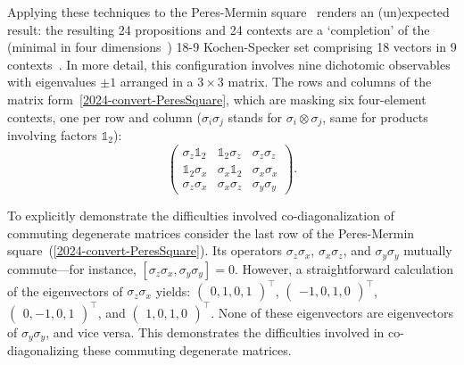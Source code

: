 \documentclass[
  twocolumn,
 showpacs,
 showkeys,
 preprintnumbers,
 amsmath,amssymb,
 aps,
 prl,
  longbibliography,
 floatfix,
 ]{revtex4-2}
\newcommand\myotimes{ }
\begin{document}
Applying these techniques to the Peres-Mermin square~\cite{peres111,mermin90b,peres-91,cabello2021contextuality} renders an (un)expected result:
the resulting 24 propositions and 24 contexts are a `completion' of the (minimal in four dimensions~\cite{Pavicic-2005}) 18-9 Kochen-Specker set comprising 18 vectors in 9 contexts~\cite{cabello-96}.
In more detail, this configuration involves nine dichotomic observables with eigenvalues $\pm 1$ arranged in a $3 \times 3$ matrix.
 The rows and columns of the matrix form~\eqref{2024-convert-PeresSquare}, which are masking six four-element contexts,
one per row and column ($\sigma_i \myotimes \sigma_j$ stands for $\sigma_i \otimes \sigma_j$, same for products involving factors $\mathbb{1}_2$):
\begin{equation}
\begin{pmatrix}
\sigma_z \myotimes  \mathbb{1}_2 & \mathbb{1}_2 \myotimes  \sigma_z & \sigma_z \myotimes  \sigma_z \\
\mathbb{1}_2 \myotimes  \sigma_x & \sigma_x \myotimes  \mathbb{1}_2 & \sigma_x \myotimes  \sigma_x \\
\sigma_z \myotimes  \sigma_x & \sigma_x \myotimes  \sigma_z & \sigma_y \myotimes  \sigma_y
\end{pmatrix}
.
\label{2024-convert-PeresSquare}
\end{equation}


To explicitly demonstrate the difficulties involved co-diagonalization of commuting degenerate matrices
consider the last row of  the Peres-Mermin square~(\ref{2024-convert-PeresSquare}).
Its operators
$\sigma_z  \myotimes   \sigma_x$, $\sigma_x  \myotimes   \sigma_z$, and $\sigma_y  \myotimes   \sigma_y $ mutually
commute---for instance, $[\sigma_z  \myotimes   \sigma_x,\sigma_y  \myotimes   \sigma_y]=0$.
However, a straightforward calculation of the eigenvectors of $\sigma_z \myotimes  \sigma_x$ yields:
$\begin{pmatrix}
{0, 1, 0, 1}
\end{pmatrix}^\intercal $,
$\begin{pmatrix}
{-1, 0, 1, 0}
\end{pmatrix}^\intercal $,
$\begin{pmatrix}
{0, -1, 0, 1}
\end{pmatrix}^\intercal $, and
$\begin{pmatrix}
{1, 0, 1, 0}
\end{pmatrix}^\intercal $.
None of these eigenvectors are eigenvectors of $\sigma_y \myotimes  \sigma_y$, and vice versa.
This demonstrates the difficulties involved in co-diagonalizing these commuting degenerate matrices.
\end{document}
